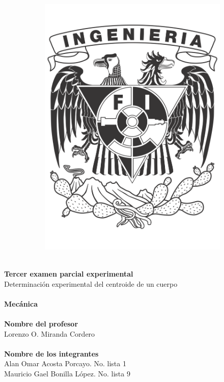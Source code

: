 \documentclass[12pt, titlepage]{report}
\begin{document}
\begin{titlepage}
\begin{center}
\begin{figure}[ht]
\begin{subfigure}[l]{0.2\textwidth}
                    \includegraphics[width=\textwidth]{Escudo_FI.png}
                \end{subfigure} 
            \end{figure}

            \Huge \textbf{\\Tercer examen parcial experimental\\}
            \huge Determinación experimental del centroide de un cuerpo\\
            \Huge \textbf{\\Mecánica\\}
            \huge \textbf{\\Nombre del profesor\\}
            \Large{Lorenzo O. Miranda Cordero\\}
            \huge \textbf{\\Nombre de los integrantes\\}
            \Large{Alan Omar Acosta Porcayo. No. lista 1\\Mauricio Gael Bonilla López. No. lista 9\\}
        \end{center}
    \end{titlepage}
\end{document}
